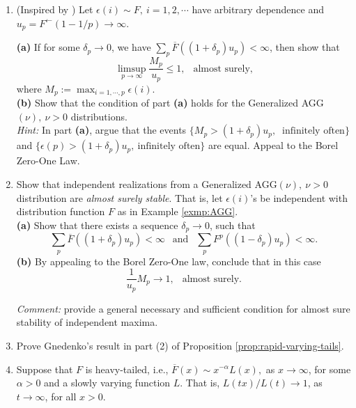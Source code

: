 
\begin{enumerate}

 \item (Inspired by \cite{resnick1973almost}) Let $\epsilon(i)\sim F,\ i=1,2,\cdots$ have arbitrary dependence 
 and $u_p = F^{\leftarrow}(1-1/p) \to \infty$. 
 
 {\bf (a)}   If for some $\delta_p\to 0$,
 we have $\sum_{p} \overline{F}((1+\delta_p)u_p) <\infty$, then show that
 $$
 \limsup_{p\to\infty} \frac{M_p}{u_p} \le 1,\ \ \mbox{ almost surely,} 
 $$
 where $M_p:= \max_{i=1,\cdots,p} \epsilon(i)$.\\
 
 {\bf (b)} Show that the condition of part {\bf (a)} holds for the Generalized AGG$(\nu),\ \nu>0$ distributions.\\
 
 {\em Hint:} In part {\bf (a)}, argue that the events $\{ M_p > (1+\delta_p) u_p,\ \mbox{ infinitely often}\}$ and
  $\{\epsilon(p) > (1+\delta_p)u_p, \ \mbox{infinitely often}\}$ are equal. Appeal to the Borel Zero-One Law.\\
 
 \item  Show that independent realizations from a Generalized AGG$(\nu),\ \nu>0$ distribution
  are {\em almost surely stable}. That is, let $\epsilon(i)$'s be independent with distribution function $F$ as in Example \ref{exmp:AGG}.\\

{\bf (a)} Show that there exists a sequence $\delta_p\to 0$, such that 
$$
\sum_p \overline F((1+\delta_p)u_p) <\infty\ \ \mbox{ and }\ \  \sum_p F^p((1-\delta_p)u_p) <\infty.
$$
 {\bf (b)} By appealing to the Borel Zero-One law, conclude that in this case
 $$
 \frac{1}{u_p} M_p {\longrightarrow} 1,\ \ \mbox{ almost surely}.
 $$

{\em Comment:} 
\cite{resnick1973almost} provide a general necessary and sufficient condition for almost sure stability of independent maxima.\\
 
 \item Prove Gnedenko's result in part (2) of Proposition \ref{prop:rapid-varying-tails}.\\
 
\item Suppose that $F$ is heavy-tailed, i.e., $\overline F(x) \sim x^{-\alpha} L(x),$ as $x\to\infty$, for some $\alpha>0$ and a
slowly varying function $L$.  That is, $L(tx)/L(t)\to 1$, as $t\to\infty$, for all $x>0$.\\


\end{enumerate}
